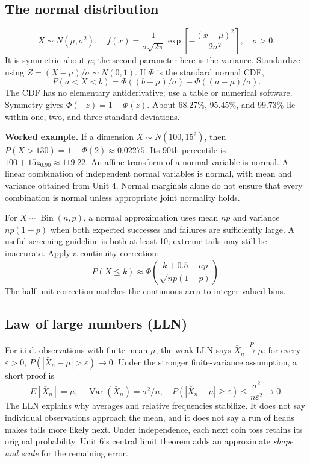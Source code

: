 \subsection{The normal distribution}
\[
X\sim N(\mu,\sigma^2),\quad
f(x)=\frac1{\sigma\sqrt{2\pi}}
\exp\!\left[-\frac{(x-\mu)^2}{2\sigma^2}\right],\quad \sigma>0.
\]
It is symmetric about $\mu$; the second parameter here is the variance.
Standardize using $Z=(X-\mu)/\sigma\sim N(0,1)$. If $\Phi$ is the standard
normal CDF,
\[
P(a<X<b)=\Phi((b-\mu)/\sigma)-\Phi((a-\mu)/\sigma).
\]
The CDF has no elementary antiderivative; use a table or numerical software.
Symmetry gives $\Phi(-z)=1-\Phi(z)$. About 68.27\%, 95.45\%, and 99.73\%
lie within one, two, and three standard deviations.

\textbf{Worked example.} If a dimension $X\sim N(100,15^2)$, then
$P(X>130)=1-\Phi(2)\approx0.02275$. Its 90th percentile is
$100+15z_{0.90}\approx119.22$.
An affine transform of a normal variable is normal. A linear combination
of independent normal variables is normal, with mean and variance obtained
from Unit 4. Normal marginals alone do not ensure that every combination is
normal unless appropriate joint normality holds.

For $X\sim\operatorname{Bin}(n,p)$, a normal approximation uses mean $np$
and variance $np(1-p)$ when both expected successes and failures are
sufficiently large. A useful screening guideline is both at least 10;
extreme tails may still be inaccurate. Apply a continuity correction:
\[
P(X\leq k)\approx
\Phi\!\left(\frac{k+0.5-np}{\sqrt{np(1-p)}}\right).
\]
The half-unit correction matches the continuous area to integer-valued bins.

\subsection{Law of large numbers (LLN)}
For i.i.d. observations with finite mean $\mu$, the weak LLN says
$\bar X_n\xrightarrow{P}\mu$: for every $\varepsilon>0$,
$P(|\bar X_n-\mu|>\varepsilon)\to0$.
Under the stronger finite-variance assumption, a short proof is
\[
E[\bar X_n]=\mu,\quad \operatorname{Var}(\bar X_n)=\sigma^2/n,
\quad P(|\bar X_n-\mu|\geq\varepsilon)
\leq\frac{\sigma^2}{n\varepsilon^2}\to0.
\]
The LLN explains why averages and relative frequencies stabilize. It does
not say individual observations approach the mean, and it does not say a
run of heads makes tails more likely next. Under independence, each next
coin toss retains its original probability. Unit 6's central limit theorem
adds an approximate \emph{shape and scale} for the remaining error.

